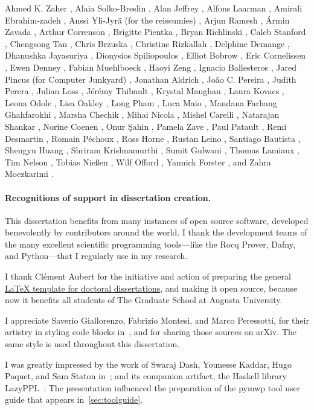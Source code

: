 Ahmed K. Zaher%
, Alaia Solko-Breslin%
, Alan Jeffrey%
, Alfons Laarman%
, Amirali Ebrahim\hyp{}zadeh%
, Anssi Yli-Jyrä (for the reissumies)%
, Arjun Ramesh%
, Ármin Zavada%
, Arthur Correnson%
, Brigitte Pientka%
, Bryan Richlinski%
, Caleb Stanford%
, Chengsong Tan%
, Chris Brzuska%
, Christine Rizkallah%
, Delphine Demange%
, Dhanushka Jayasuriya%
, Dionysios Spiliopoulos%
, Elliot Bobrow%
, Eric Cornelissen%
, Ewen Denney%
, Fabian Muehlboeck%
, Haoyi Zeng%
, Ignacio Ballesteros%
, Jared Pincus (for Computer Junkyard)%
, Jonathan Aldrich%
, João C. Pereira%
, Judith Perera%
, Julian Loss%
, Jérémy Thibault%
, Krystal Maughan%
, Laura Kovacs%
, Leona Odole%
, Lisa Oakley%
, Long Pham%
, Luca Maio%
, Mandana Farhang Ghahfarokhi%
, Marsha Chechik%
, Mihai Nicola%
, Mishel Carelli%
, Natarajan Shankar%
, Norine Coenen%
, Onur Şahin%
, Pamela Zave%
, Paul Patault%
, Remi Desmartin%
, Romain Péchoux%
, Ross Horne%
, Rustan Leino%
, Santiago Bautista%
, Shengyu Huang%
, Shriram Krishnamurthi%
, Sumit Gulwani%
, Thomas Lamiaux%
, Tim Nelson%
, Tobias Nießen%
, Wilf Offord%
, Yannick Forster%
, and Zahra Moezkarimi%
.


\paragraph*{Recognitions of support in dissertation creation.}
This dissertation benefits from many instances of open source software, developed benevolently by contributors around the world.
I thank the development teams of the many excellent scientific programming tools---like the Rocq Prover, Dafny, and Python---that I regularly use in my research.

I thank Clément Aubert for the initiative and action of preparing the general \href{https://github.com/the-au-forml-lab/au_ccs_dissertation_template}{\LaTeX{ }template for doctoral dissertations},
and making it open source, because now it benefits all students of The Graduate School at Augusta University.

I appreciate Saverio Giallorenzo, Fabrizio Montesi, and Marco Peressotti, for their artistry in styling code blocks in~\cite{giallorenzo2024},
and for sharing those sources on arXiv.
The same style is used throughout this dissertation.

I was greatly impressed by the work of Swaraj Dash, Younesse Kaddar, Hugo Paquet, and Sam Staton in~\cite{dash2023};
and its companion artifact, the Haskell library LazyPPL~\cite{dash2023b}.
The presentation influenced the preparation of the pymwp tool user guide that appears in~\autoref{sec:toolguide}.

